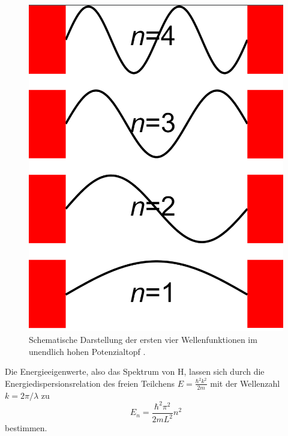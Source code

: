 \begin{figure}
  \centering
  \includegraphics[width=\textwidth]{data/kasten.png}
  \caption{Schematische Darstellung der ersten vier Wellenfunktionen im unendlich hohen Potenzialtopf \cite{kasten}.}
  \label{fig:kasten}
\end{figure}

Die Energieeigenwerte, also das Spektrum von H, lassen sich durch die Energiedispersionsrelation des freien Teilchens $E = \frac{\hbar^2 k^2}{2m}$ mit der Wellenzahl $k = 2 \pi / \lambda$ zu
\begin{equation}
  E_n = \frac{\hbar^2 \pi^2}{2 m L^2} n^2
  \label{eqn:kastenEnergien}
\end{equation}
bestimmen.

